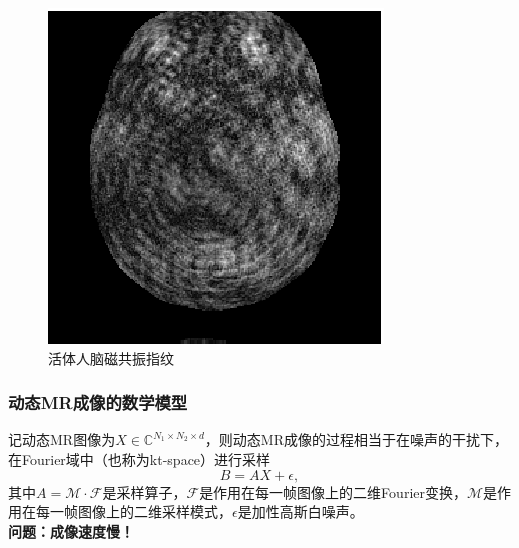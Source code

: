 \documentclass{beamer}
\begin{document}

\begin{frame}
	\frametitle{动态MR成像的数学模型}
记动态MR图像为$X\in \mathbb{C}^{N_1\times N_2\times d}$，则动态MR成像的过程相当于在噪声的干扰下，在Fourier域中（也称为kt-space）进行采样
\begin{equation}
	B=AX+\epsilon,
\end{equation}
其中$A=\mathcal{M}\cdot\mathcal{F}$是采样算子，$\mathcal{F}$是作用在每一帧图像上的二维Fourier变换，$\mathcal{M}$是作用在每一帧图像上的二维采样模式，$\epsilon$是加性高斯白噪声。
\vspace{1cm}\\
\large{\textbf{问题：成像速度慢！}}
\end{frame}
\end{document}
